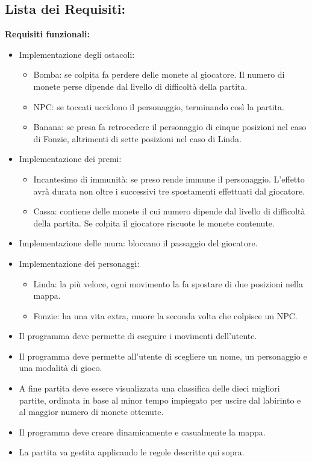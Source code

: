 \documentclass[12pt, letterpaper]{article}
\begin{document}
    \subsection{Lista dei Requisiti:}
        \textbf{Requisiti funzionali:}
            \begin{itemize}
                \item Implementazione degli ostacoli:
                \begin{itemize}
                    \item Bomba: se colpita fa perdere delle  monete al giocatore. Il numero di monete perse dipende dal livello di difficoltà della partita.
                    \item NPC: se toccati uccidono il personaggio, terminando così la partita.
                    \item Banana: se presa fa retrocedere il personaggio di cinque posizioni nel caso di Fonzie, altrimenti di sette posizioni nel caso di Linda.
                \end{itemize}
                \item Implementazione dei premi:
                \begin{itemize}
                    \item Incantesimo di immunità: se preso rende immune il personaggio. L'effetto avrà durata non oltre i successivi tre spostamenti effettuati dal giocatore.
                    \item Cassa: contiene delle monete il cui numero dipende dal livello di difficoltà della partita. Se colpita il giocatore riscuote le monete contenute.
                \end{itemize}
                \item Implementazione delle mura: bloccano il passaggio del giocatore.
                \item Implementazione dei personaggi:
                \begin{itemize}
                    \item Linda: la più veloce, ogni movimento la fa spostare di due posizioni nella mappa.
                    \item Fonzie: ha una vita extra, muore la seconda volta che colpisce un NPC.
                \end{itemize}
                \item Il programma deve permette di eseguire i movimenti dell'utente. 
                \item Il programma deve permette all'utente di scegliere un nome, un personaggio e una modalità di gioco.
                \item A fine partita deve essere visualizzata una classifica delle dieci migliori partite, ordinata in base al minor tempo impiegato per uscire dal labirinto e al maggior numero di monete ottenute.
                \item Il programma deve creare dinamicamente e casualmente la mappa.
                \item La partita va gestita applicando le regole descritte qui sopra.
            \end{itemize}
\end{document}
